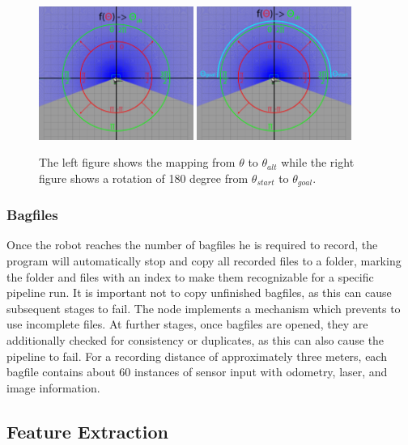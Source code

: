 \begin{figure}[h]%
\centering
\includegraphics[width=0.45\textwidth]{Bilder/theta_thetaAlt.png} 
\hspace{0.3 cm}
\includegraphics[width=0.45\textwidth]{Bilder/theta_thetaAlt_example.png} 
\caption[]{The left figure shows the mapping from $\theta$ to $\theta_{alt}$ while the right figure shows a rotation of 180 degree from $\theta_{start}$ to $\theta_{goal}$.}
\label{theta_alt}
\end{figure}

\subsubsection{Bagfiles \label{bagfiles} }
Once the robot reaches the number of bagfiles he is required to record, the program will automatically stop and copy all recorded files to a folder, marking the folder and files with an index to make them recognizable for a specific pipeline run.  It is important not to copy unfinished bagfiles, as this can cause subsequent stages to fail.  The node implements a mechanism which prevents to use incomplete files. At further stages, once bagfiles are opened, they are additionally checked for consistency or duplicates, as this can also cause the pipeline to fail. For a recording distance of approximately three meters, each bagfile contains about 60 instances of sensor input with odometry, laser, and image information.
\newpage

\subsection{Feature Extraction \label{FeatureExtraction} }

